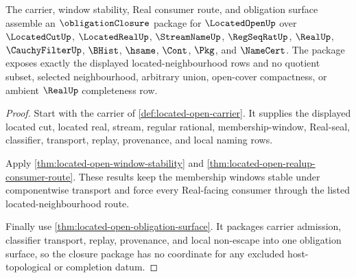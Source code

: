 \begin{theorem}
\label{thm:located-open-obligation-closure-surface}
The carrier, window stability, Real consumer route, and obligation surface
assemble an $\obligationClosure$ package for $\LocatedOpenUp$ over
$\LocatedCutUp$, $\LocatedRealUp$, $\StreamNameUp$, $\RegSeqRatUp$, $\RealUp$,
$\CauchyFilterUp$, $\BHist$, $\hsame$, $\Cont$, $\Pkg$, and $\NameCert$. The
package exposes exactly the displayed located-neighbourhood rows and no
quotient subset, selected neighbourhood, arbitrary union, open-cover
compactness, or ambient $\RealUp$ completeness row.
\end{theorem}
\begin{proof}
Start with the carrier of \autoref{def:located-open-carrier}. It supplies the
displayed located cut, located real, stream, regular rational,
membership-window, Real-seal, classifier, transport, replay, provenance, and
local naming rows.

Apply \autoref{thm:located-open-window-stability} and
\autoref{thm:located-open-realup-consumer-route}. These results keep the
membership windows stable under componentwise transport and force every
Real-facing consumer through the listed located-neighbourhood route.

Finally use \autoref{thm:located-open-obligation-surface}. It packages carrier
admission, classifier transport, replay, provenance, and local non-escape into
one obligation surface, so the closure package has no coordinate for any
excluded host-topological or completion datum.
\end{proof}

